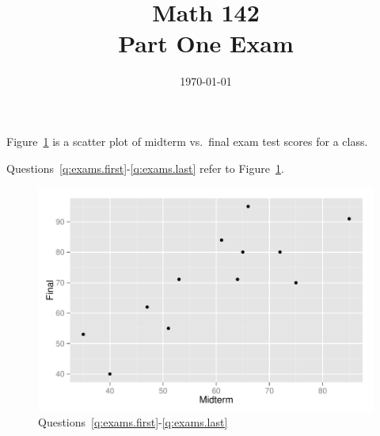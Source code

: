 \documentclass[letterpaper, landscape]{exam}
\title{Math 142 \\ Part One Exam}
\date{\today}
\author{}
\begin{document}
  \maketitle



  Figure~\ref{fig:exams} is a scatter plot of midterm vs.\ final exam test scores
  for a class.

  Questions~\ref{q:exams.first}-\ref{q:exams.last} refer to Figure~\ref{fig:exams}.  

  \begin{figure}[H]
    \centering
    \includegraphics[scale = 0.5]{figures/exams_scatter.pdf}
    \caption{Questions~\ref{q:exams.first}-\ref{q:exams.last}}\label{fig:exams}
  \end{figure}
\end{document}
